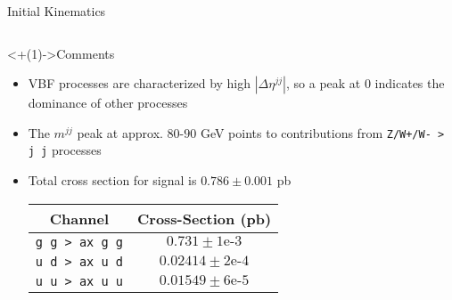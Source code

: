 \documentclass[handout]{beamer}
\begin{document}
\begin{frame}{Initial Kinematics}
    \begin{columns}
        \begin{column}{0.5\linewidth}
            \begin{block}<+(1)->{Comments}
                \begin{itemize}[<+(1)->]
                    \item VBF processes are characterized by high $|\Delta \eta^{jj}|$, so a peak at $0$ indicates the dominance of other processes
                    \item The $m^{jj}$ peak at approx. $80$-$90$ GeV points to contributions from \texttt{Z/W+/W- > j j} processes
                    \item Total cross section for signal is $0.786 \pm 0.001$ pb
                    
                    \smallskip
                    
                    \begin{tabular}{|c|c|}
                        \hline
                        Channel & Cross-Section (pb) \\
                        \hline
                        \hline
                        \texttt{g g > ax g g} & $0.731 \pm 1\text{e-}3$\\
                        \texttt{u d > ax u d} & $0.02414 \pm 2\text{e-}4$\\
                        \texttt{u u > ax u u} & $0.01549 \pm 6\text{e-}5$\\
                        \hline
                    \end{tabular}
                    
                    \smallskip
                    

\end{itemize}
\end{block}
\end{column}
\end{columns}
\end{frame}
\end{document}
